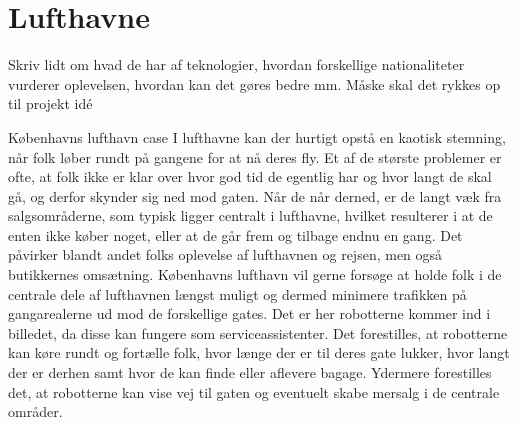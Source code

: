 \section{Lufthavne}
\label{Lufthavne}
%
Skriv lidt om hvad de har af teknologier, hvordan forskellige nationaliteter vurderer oplevelsen, hvordan kan det gøres bedre mm. Måske skal det rykkes op til projekt idé


Københavns lufthavn case
I lufthavne kan der hurtigt opstå en kaotisk stemning, når folk løber rundt på gangene for at nå deres fly. Et af de største problemer er ofte, at folk ikke er klar over hvor god tid de egentlig har og hvor langt de skal gå, og derfor skynder sig ned mod gaten. Når de når derned, er de langt væk fra salgsområderne, som typisk ligger centralt i lufthavne, hvilket resulterer i at de enten ikke køber noget, eller at de går frem og tilbage endnu en gang. Det påvirker blandt andet folks oplevelse af lufthavnen og rejsen, men også butikkernes omsætning. Københavns lufthavn vil gerne forsøge at holde folk i de centrale dele af lufthavnen længst muligt og dermed minimere trafikken på gangarealerne ud mod de forskellige gates. Det er her robotterne kommer ind i billedet, da disse kan fungere som serviceassistenter. Det forestilles, at robotterne kan køre rundt og fortælle folk, hvor længe der er til deres gate lukker, hvor langt der er derhen samt hvor de kan finde eller aflevere bagage. Ydermere forestilles det, at robotterne kan vise vej til gaten og eventuelt skabe mersalg i de centrale områder.